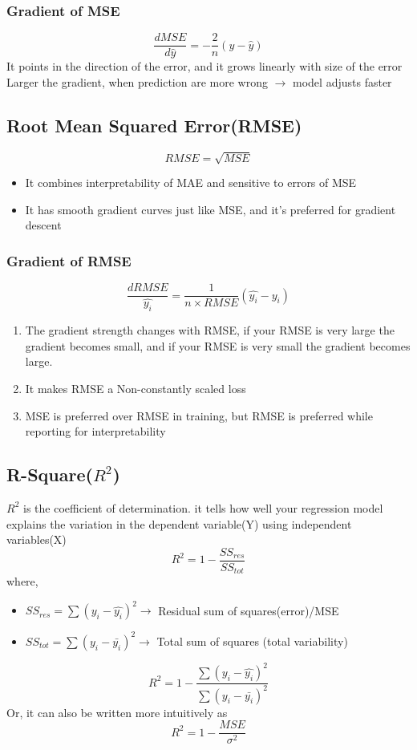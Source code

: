 \documentclass[12pt]{extarticle}
\begin{document}
\subsubsection{Gradient of MSE}
$$\frac{d MSE}{d\hat{y}} = -\frac{2}{n}(y-\hat{y})$$
It points in the direction of the error, and it grows linearly with size of the error
Larger the gradient, when prediction are more wrong \(\longrightarrow\) model adjusts faster


\subsection{Root Mean Squared Error(RMSE)}  
$$RMSE = \sqrt{MSE}$$ 
\begin{itemize}
    \item It combines interpretability of MAE and sensitive to errors of MSE
    \item It has smooth gradient curves just like MSE, and it's preferred for gradient descent 
\end{itemize}

\subsubsection{Gradient of RMSE}
$$ \frac{d RMSE}{\hat{y_i}} = \frac{1}{n \times RMSE} (\hat{y_i}-y_i)$$
\begin{enumerate}
    \item The gradient strength changes with RMSE, if your RMSE is very large the gradient becomes small, and if your RMSE is very small the gradient becomes large.
    \item It makes RMSE a Non-constantly scaled loss
    \item MSE is preferred over RMSE in training, but RMSE is preferred while reporting for interpretability  
\end{enumerate}

\subsection{R-Square(\(R^2\))}
\(R^2\) is the coefficient of determination. it tells how well your regression model 
explains the variation in the dependent variable(Y) using independent variables(X)
$$R^2 = 1-\frac{SS_{res}}{SS_{tot}}$$
where,
\begin{itemize}
    \item \(SS_{res} = \sum(y_i - \hat{y_i})^2 \to\) Residual sum of squares(error)/MSE
    \item \( SS_{tot} = \sum(y_i - \bar{y_i})^2 \to\) Total sum of squares (total variability)
\end{itemize}
$$R^2 = 1-\frac{ \sum(y_i - \hat{y_i})^2 }{ \sum(y_i - \bar{y_i})^2} $$
Or, it can also be written more intuitively as 
$$ R^2 = 1 - \frac{MSE}{\sigma^2} $$
\end{document}
